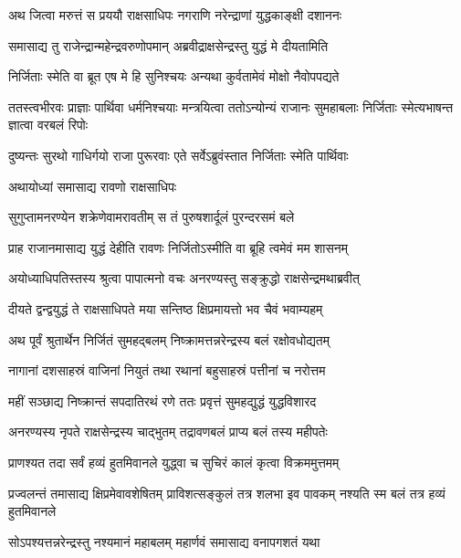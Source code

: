 
\twolineshloka
{अथ जित्वा मरुत्तं स प्रययौ राक्षसाधिपः}
{नगराणि नरेन्द्राणां युद्धकाङ्क्षी दशाननः} %

\twolineshloka
{समासाद्य तु राजेन्द्रान्महेन्द्रवरुणोपमान्}
{अब्रवीद्राक्षसेन्द्रस्तु युद्धं मे दीयतामिति} %

\twolineshloka
{निर्जिताः स्मेति वा ब्रूत एष मे हि सुनिश्चयः}
{अन्यथा कुर्वतामेवं मोक्षो नैवोपपद्यते} %

\threelineshloka
{ततस्त्वभीरवः प्राज्ञाः पार्थिवा धर्मनिश्चयाः}
{मन्त्रयित्वा ततोऽन्योन्यं राजानः सुमहाबलाः}
{निर्जिताः स्मेत्यभाषन्त ज्ञात्वा वरबलं रिपोः} %

\twolineshloka
{दुष्यन्तः सुरथो गाधिर्गयो राजा पुरूरवाः}
{एते सर्वेऽब्रुवंस्तात निर्जिताः स्मेति पार्थिवाः} %

\onelineshloka
{अथायोध्यां समासाद्य रावणो राक्षसाधिपः} %

\twolineshloka
{सुगुप्तामनरण्येन शक्रेणेवामरावतीम्}
{स तं पुरुषशार्दूलं पुरन्दरसमं बले} %

\twolineshloka
{प्राह राजानमासाद्य युद्धं देहीति रावणः}
{निर्जितोऽस्मीति वा ब्रूहि त्वमेवं मम शासनम्} %

\twolineshloka
{अयोध्याधिपतिस्तस्य श्रुत्वा पापात्मनो वचः}
{अनरण्यस्तु सङ्क्रुद्धो राक्षसेन्द्रमथाब्रवीत्} %

\twolineshloka
{दीयते द्वन्द्वयुद्धं ते राक्षसाधिपते मया}
{सन्तिष्ठ क्षिप्रमायत्तो भव चैवं भवाम्यहम्} %

\twolineshloka
{अथ पूर्वं श्रुतार्थेन निर्जितं सुमहद्बलम्}
{निष्क्रामत्तन्नरेन्द्रस्य बलं रक्षोवधोद्यतम्} %

\twolineshloka
{नागानां दशसाहस्रं वाजिनां नियुतं तथा}
{रथानां बहुसाहस्रं पत्तीनां च नरोत्तम} %

\twolineshloka
{महीं सञ्छाद्य निष्क्रान्तं सपदातिरथं रणे}
{ततः प्रवृत्तं सुमहद्युद्धं युद्धविशारद} %

\twolineshloka
{अनरण्यस्य नृपते राक्षसेन्द्रस्य चाद्भुतम्}
{तद्रावणबलं प्राप्य बलं तस्य महीपतेः} %

\twolineshloka
{प्राणश्यत तदा सर्वं हव्यं हुतमिवानले}
{युद्ध्वा च सुचिरं कालं कृत्वा विक्रममुत्तमम्} %

\threelineshloka
{प्रज्वलन्तं तमासाद्य क्षिप्रमेवावशेषितम्}
{प्राविशत्सङ्कुलं तत्र शलभा इव पावकम्}
{नश्यति स्म बलं तत्र हव्यं हुतमिवानले} %

\twolineshloka
{सोऽपश्यत्तन्नरेन्द्रस्तु नश्यमानं महाबलम्}
{महार्णवं समासाद्य वनापगशतं यथा} %

